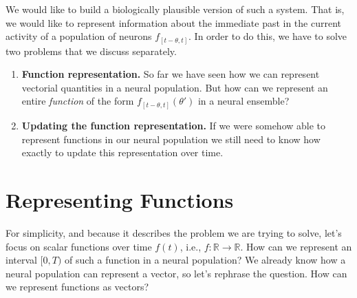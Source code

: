 \documentclass[10pt,letterpaper,oneside]{article}
\begin{document}
We would like to build a biologically plausible version of such a system. That is, we would like to represent information about the immediate past in the current activity of a population of neurons $f_{[t - \theta, t]}$. In order to do this, we have to solve two problems that we discuss separately.
\begin{enumerate}[1.]
	\item \textbf{Function representation.} So far we have seen how we can represent vectorial quantities in a neural population. But how can we represent an entire \emph{function} of the form $f_{[t - \theta, t]}(\theta')$ in a neural ensemble?
	\item \textbf{Updating the function representation.} If we were somehow able to represent functions in our neural population we still need to know how exactly to update this representation over time.
\end{enumerate}



\section{Representing Functions}

For simplicity, and because it describes the problem we are trying to solve, let's focus on scalar functions over time $f(t)$, i.e., $f : \mathbb{R} \longrightarrow \mathbb{R}$. How can we represent an interval $[0, T)$ of such a function in a neural population? We already know how a neural population can represent a vector, so let's rephrase the question. How can we represent functions as vectors?
\end{document}
